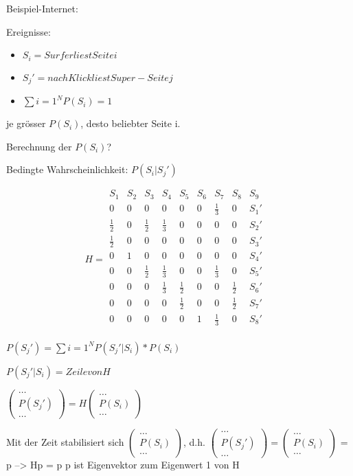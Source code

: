 \documentclass[10pt,a4paper]{scrartcl}
\begin{document}
Beispiel-Internet:

Ereignisse:
\begin{itemize}
\item $S_{i} = {Surfer liest Seite i}$
\item $S_{j}' = {nach Klick liest Super-Seite j}$
\item $\sum\limits{i=1}^N P(S_{i}) = 1$
\end{itemize}
je grösser $P(S_{i})$, desto beliebter Seite i.

Berechnung der $P(S_{i})$?

Bedingte Wahrscheinlichkeit: $P(S_{i}|S_{j}')$

$$H = 
\begin{matrix}
  S_{1} & S_{2} & S_{3} & S_{4} & S_{5} & S_{6} & S_{7} & S_{8} & S_{9} &  \\
  0 & 0 & 0 & 0 & 0 & 0 & \frac{1}{3} & 0 & S_{1}' \\
  \frac{1}{2} & 0 & \frac{1}{2} & \frac{1}{3} & 0 & 0 & 0 & 0 & S_{2}' \\
  \frac{1}{2} & 0 & 0 & 0 & 0 & 0 & 0 & 0 & S_{3}' \\
  0 & 1 & 0 & 0 & 0 & 0 & 0 & 0 & S_{4}' \\
  0 & 0 & \frac{1}{2} & \frac{1}{3} & 0 & 0 & \frac{1}{3} & 0 & S_{5}' \\
  0 & 0 & 0 & \frac{1}{3} & \frac{1}{2} & 0 & 0 & \frac{1}{2} & S_{6}' \\
  0 & 0 & 0 & 0 & \frac{1}{2} & 0 & 0 & \frac{1}{2} & S_{7}' \\
  0 & 0 & 0 & 0 & 0 & 1 & \frac{1}{3} & 0 & S_{8}' \\
\end{matrix}$$

$P(S_{j}') = \sum\limits{i=1}^N P(S_{j}'|S_{i}) * P(S_{i})$

$P(S_{j}'|S_{i}) = Zeile von H$

$\begin{pmatrix}
\dots \\
P(S_{j}') \\
\dots
\end{pmatrix} = H \begin{pmatrix}
\dots \\
P(S_{i}) \\
\dots
\end{pmatrix}$

Mit der Zeit stabilisiert sich $\begin{pmatrix}
\dots \\
P(S_{i}) \\
\dots
\end{pmatrix}$, d.h. $\begin{pmatrix}
\dots \\
P(S_{j}') \\
\dots
\end{pmatrix} = \begin{pmatrix}
\dots \\
P(S_{i}) \\
\dots
\end{pmatrix}$ = p --> Hp = p
p ist Eigenvektor zum Eigenwert 1 von H
\end{document}
